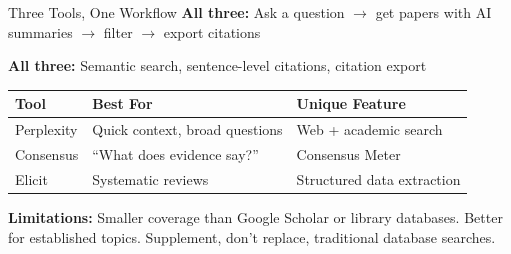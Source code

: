 \documentclass[aspectratio=169]{beamer}
\begin{document}
  \begin{frame}{Three Tools, One Workflow}
      \textbf{All three:} Ask a question $\rightarrow$ get papers with AI summaries $\rightarrow$ filter $\rightarrow$ export
  citations

      \vspace{0.5em}
      \textbf{All three:} Semantic search, sentence-level citations, citation export

      \vspace{1em}
      \begin{table}
          \centering
          \begin{tabular}{lll}
              \toprule
              \textbf{Tool} & \textbf{Best For} & \textbf{Unique Feature} \\
              \midrule
              Perplexity & Quick context, broad questions & Web + academic search \\
              Consensus & ``What does evidence say?'' & Consensus Meter \\
              Elicit & Systematic reviews & Structured data extraction \\
              \bottomrule
          \end{tabular}
      \end{table}

      \vspace{1em}
      \textbf{Limitations:} Smaller coverage than Google Scholar or library databases. Better for established topics. Supplement,
  don't replace, traditional database searches.
  \end{frame}

\end{document}
